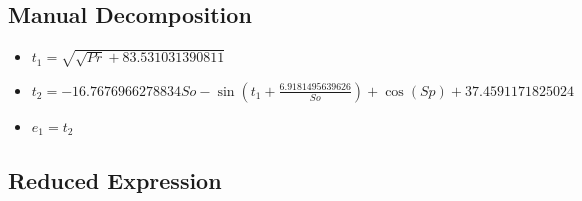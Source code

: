 \documentclass{article}
\begin{document}
\subsection*{Manual Decomposition}
\begin{itemize}
\item $t_{1} = \sqrt{\sqrt{Pr} + 83.531031390811}$
\item $t_{2} = - 16.7676966278834 So - \sin{\left(t_{1} + \frac{6.9181495639626}{So} \right)} + \cos{\left(Sp \right)} + 37.4591171825024$
\item $e_{1} = t_{2}$
\end{itemize}
\subsection*{Reduced Expression}
\end{document}
